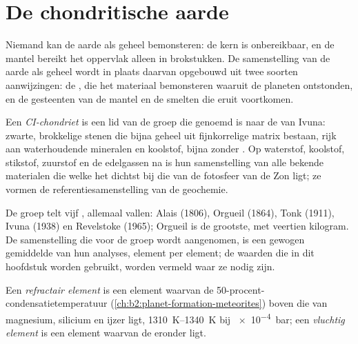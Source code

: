 \section{De chondritische aarde}

Niemand kan de aarde als geheel bemonsteren: de kern is onbereikbaar, en de
mantel bereikt het oppervlak alleen in brokstukken. De samenstelling van de aarde als geheel wordt
in plaats daarvan opgebouwd uit twee soorten aanwijzingen: de , die het
materiaal bemonsteren waaruit de planeten ontstonden, en de gesteenten van de mantel en de
smelten die eruit voortkomen.

\begin{definition}[CI-chondriet]\label{def:b2:elements-in-the-earth:ci}
Een \emph{CI-chondriet} is een lid van de groep
 die genoemd is naar de  van Ivuna: zwarte, brokkelige stenen
die bijna geheel uit fijnkorrelige matrix bestaan, rijk aan waterhoudende mineralen en
koolstof, bijna zonder . Op waterstof, koolstof, stikstof, zuurstof en de
edelgassen na is hun samenstelling van alle bekende materialen die welke het dichtst bij die van
de fotosfeer van de Zon ligt; ze vormen de referentiesamenstelling van de geochemie.
\end{definition}

De groep telt vijf , allemaal vallen: Alais (1806), Orgueil
(1864), Tonk (1911), Ivuna (1938) en Revelstoke (1965); Orgueil is de grootste,
met veertien kilogram. De samenstelling die voor de groep wordt aangenomen, is een gewogen gemiddelde
van hun analyses, element per element; de waarden die in dit hoofdstuk worden gebruikt, worden
vermeld waar ze nodig zijn.

\begin{definition}
\label{def:b2:elements-in-the-earth:volatility}
Een \emph{refractair element} is een element waarvan de
50-procent-condensatietemperatuur (\cref{ch:b2:planet-formation-meteorites}) boven
die van magnesium, silicium en ijzer ligt, \qtyrange{1310}{1340}{K} bij
\qty{e-4}{bar}; een
\emph{vluchtig element} is een element waarvan de
 eronder ligt.
\end{definition}

